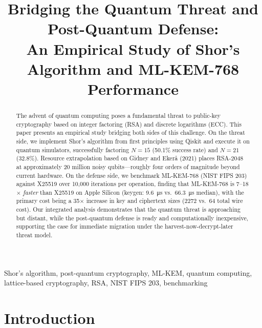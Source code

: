 \documentclass[conference]{IEEEtran}
\begin{document}
\title{Bridging the Quantum Threat and Post-Quantum Defense:\\An Empirical Study of Shor's Algorithm and ML-KEM-768 Performance}

\author{
}

\maketitle

\begin{abstract}
The advent of quantum computing poses a fundamental threat to public-key cryptography based on integer factoring (RSA) and discrete logarithms (ECC). This paper presents an empirical study bridging both sides of this challenge. On the threat side, we implement Shor's algorithm from first principles using Qiskit and execute it on quantum simulators, successfully factoring $N=15$ (50.1\% success rate) and $N=21$ (32.8\%). Resource extrapolation based on Gidney and Eker\aa{} (2021) places RSA-2048 at approximately 20 million noisy qubits---roughly four orders of magnitude beyond current hardware. On the defense side, we benchmark ML-KEM-768 (NIST FIPS 203) against X25519 over 10,000 iterations per operation, finding that ML-KEM-768 is 7--18$\times$ \emph{faster} than X25519 on Apple Silicon (keygen: \SI{9.6}{\micro\second} vs.\ \SI{66.3}{\micro\second} median), with the primary cost being a 35$\times$ increase in key and ciphertext sizes (\SI{2272}{\byte} vs.\ \SI{64}{\byte} total wire cost). Our integrated analysis demonstrates that the quantum threat is approaching but distant, while the post-quantum defense is ready and computationally inexpensive, supporting the case for immediate migration under the harvest-now-decrypt-later threat model.
\end{abstract}

\begin{IEEEkeywords}
Shor's algorithm, post-quantum cryptography, ML-KEM, quantum computing, lattice-based cryptography, RSA, NIST FIPS 203, benchmarking
\end{IEEEkeywords}

\section{Introduction}
\label{sec:intro}
\end{document}
